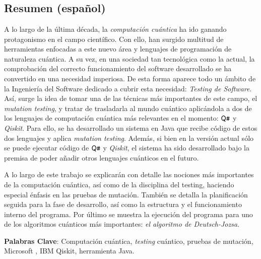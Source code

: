 \chapter*{}

\section*{Resumen (español)}
A lo largo de la última década, la \emph{computación cuántica} ha ido ganando protagonismo en el campo científico. Con ello, han surgido multitud de herramientas enfocadas a este nuevo área y lenguajes de programación de naturaleza cuántica.
%
A su vez, en una sociedad tan tecnológica como la actual, la comprobación del correcto funcionamiento del software desarrollado se ha convertido en una necesidad imperiosa. De esta forma aparece todo un ámbito de la Ingeniería del Software dedicado a cubrir esta necesidad: \emph{Testing de Software}.
%
Así, surge la idea de tomar una de las técnicas más importantes de este campo, el \textit{mutation testing}, y tratar de trasladarla al mundo cuántico aplicándola a dos de los lenguajes de computación cuántica más relevantes en el momento: $\textsf{Q}\texttt{\#}$  y \textit{Qiskit}. Para ello, se ha desarrollado un sistema en Java que recibe código de estos  dos lenguajes  y aplica \textit{mutation testing}. Además, si bien en la versión actual sólo se puede ejecutar código de $\textsf{Q}\texttt{\#}$ y \textit{Qiskit}, el sistema ha sido desarrollado bajo la premisa de poder añadir otros lenguajes cuánticos en el futuro.

A lo largo de este trabajo se explicarán con detalle las nociones más importantes de la computación cuántica, así como de la disciplina del testing, haciendo especial énfasis en las pruebas de mutación. También se detalla la planificación seguida para la fase de desarrollo, así como la estructura y el funcionamiento interno del programa. Por último se muestra la ejecución del programa para uno de los algoritmos cuánticos más importantes: \textit{el algoritmo de Deutsch-Jozsa.}

\textbf{Palabras Clave}: Computación cuántica, \textit{testing} cuántico, pruebas de mutación, Microsoft \qsh, IBM Qiskit, herramienta Java.
\newpage

